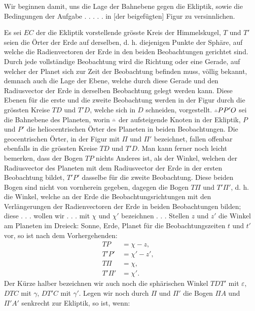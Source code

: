 Wir beginnen damit, uns die Lage der Bahnebene gegen die Ekliptik, sowie die Bedingungen der Aufgabe . . . . . in [der beigefügten] Figur zu versinnlichen.
\begin{center}\end{center}
\clearpage
{}
Es sei $EC$ der die Ekliptik vorstellende grösste Kreis der Himmelskugel, $T$ und $T'$ seien die Örter der Erde auf derselben, d. h. diejenigen Punkte der Sphäre, auf welche die Radienvectoren der Erde in den beiden Beobachtungen gerichtet sind. Durch jede vollständige Beobachtung wird die Richtung oder eine Gerade, auf welcher der Planet sich zur Zeit der Beobachtung befinden muss, völlig bekannt, demnach auch die Lage der Ebene, welche durch diese Gerade und den Radiusvector der Erde in derselben Beobachtung gelegt werden kann. Diese Ebenen für die erste und die zweite Beobachtung werden in der Figur durch die grössten Kreise $TD$ und $T'D$, welche sich in $D$ schneiden, vorgestellt. $\AstNode PP'O$ sei die Bahnebene des Planeten, worin $\AstNode$ der aufsteigende Knoten in der Ekliptik, $P$ und $P'$ die heliocentrischen Örter des Planeten in beiden Beobachtungen. Die geocentrischen Örter, in der Figur mit $\Pi$ und $\Pi'$ bezeichnet, fallen offenbar ebenfalls in die grössten Kreise $TD$ und $T'D$. Man kann ferner noch leicht bemerken, dass der Bogen $TP$ nichts Anderes ist, als der Winkel, welchen der Radiusvector des Planeten mit dem Radiusvector der Erde in der ersten Beobachtung bildet, $T'P'$ dasselbe für die zweite Beobachtung. Diese beiden Bogen sind nicht von vornherein gegeben, dagegen die Bogen $T\Pi$ und $T'\Pi'$, d. h. die Winkel, welche an der Erde die Beobachtungsrichtungen mit den Verlängerungen der Radienvectoren der Erde in beiden Beobachtungen bilden; diese . . . wollen wir . . . mit $\chi$ und $\chi'$ bezeichnen . . . Stellen $z$ und $z'$ die Winkel am Planeten im Dreieck: Sonne, Erde, Planet für die Beobachtungszeiten $t$ und $t'$ vor, so ist nach dem Vorhergehenden:
\[
\begin{aligned}
TP&=\chi-z,\\
T'P'&=\chi'-z',\\
T\Pi&=\chi,\\
T'\Pi'&=\chi'.
\end{aligned}
\]
\noindent\hspace*{\parindent}Der Kürze halber bezeichnen wir auch noch die sphärischen Winkel $TDT'$ mit $\varepsilon$, $DTC$ mit $\gamma$, $DT'C$ mit $\gamma'$. Legen wir noch durch $\Pi$ und $\Pi'$ die Bogen $\Pi A$ und $\Pi'A'$ senkrecht zur Ekliptik, so ist, wenn:
